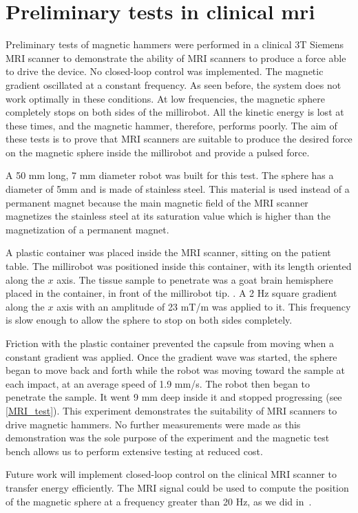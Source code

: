 \documentclass[letterpaper, 10 pt, journal, twoside]{ieeetran}
\begin{document}
\section{Preliminary tests in clinical mri}
\label{MRI_tests}
Preliminary tests of magnetic hammers were performed in a clinical 3T Siemens MRI scanner to demonstrate the ability of MRI scanners to produce a force able to drive the device.
No closed-loop control was implemented. 
The magnetic gradient  oscillated at a constant frequency. 
As seen before, the system does not work optimally in these conditions. 
At low frequencies, the magnetic sphere completely stops on both sides of the millirobot. 
All the kinetic energy is lost at these times, and the magnetic hammer, therefore, performs poorly. 
The aim of these tests is to prove that MRI scanners are suitable to produce the desired force on the magnetic sphere inside the millirobot and provide a pulsed force.\par
A 50 mm long, 7 mm diameter robot was built for this test. The sphere has a diameter of 5mm and is made of stainless steel. This material is used instead of a permanent magnet because the main magnetic field of the MRI scanner magnetizes the stainless steel at its saturation value which is higher than the magnetization of a permanent magnet.\par
A plastic container was placed inside the MRI scanner, sitting on the patient table. The millirobot was positioned inside this container, with its length oriented along the $x$ axis. The tissue sample to penetrate was a goat brain hemisphere placed in the container, in front of the millirobot tip. .
A 2 Hz square gradient along the $x$ axis with an amplitude of 23 mT/m was applied to it. 
This frequency is slow enough to allow the sphere to stop on both sides completely. \par
Friction with the plastic container prevented the capsule from moving when a constant gradient was applied. Once the gradient wave was started, the sphere began to move back and forth while the robot was moving toward the sample at each impact, at an average speed of 1.9 mm/s. 
 The robot then began to penetrate the sample. It went 9 mm deep inside it and stopped progressing (see \cref{MRI_test}). 
This experiment demonstrates the suitability of MRI scanners to drive magnetic hammers. No further measurements were made as this demonstration was the sole purpose of the experiment and the magnetic test bench allows us to perform extensive testing at reduced cost.\par
Future work will implement closed-loop control on the clinical MRI scanner to transfer energy efficiently. 
The MRI signal could be used to compute the position of the magnetic sphere at a frequency greater than 20 Hz, as we did in~\cite{578}.
\end{document}
